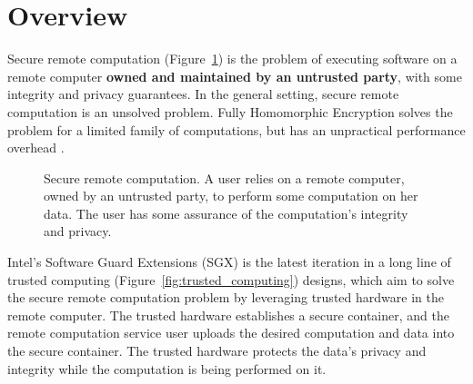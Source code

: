 \section{Overview}
\label{sec:intro}

Secure remote computation (Figure~\ref{fig:remote_computation}) is the problem
of executing software on a remote computer \textbf{owned and maintained by an
untrusted party}, with some integrity and privacy guarantees. In the general
setting, secure remote computation is an unsolved problem. Fully Homomorphic
Encryption \cite{gentry2009fhe} solves the problem for a limited family of
computations, but has an unpractical performance overhead
\cite{naehrig2011can}.

\begin{figure}[hbt]
  \caption{
    Secure remote computation. A user relies on a remote computer, owned by an
    untrusted party, to perform some computation on her data. The user has some
    assurance of the computation's integrity and privacy.
  }
  \label{fig:remote_computation}
\end{figure}

Intel's Software Guard Extensions (SGX) is the latest iteration in a long line
of trusted computing (Figure~\ref{fig:trusted_computing}) designs, which aim to
solve the secure remote computation problem by leveraging trusted hardware in
the remote computer. The trusted hardware establishes a secure container, and
the remote computation service user uploads the desired computation and data
into the secure container. The trusted hardware protects the data's privacy
and integrity while the computation is being performed on it.

